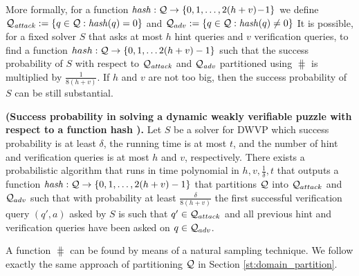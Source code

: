 More formally, for a function $\operatorname{\mathit{hash}}:\mathcal{Q} \rightarrow \{0,1,\dotsc, 2(h+v)\!-\!1 \}$
we define $\mathcal{Q}_{\mathit{attack}} := \{q \in \mathcal{Q} : \operatorname{\mathit{hash}}(q) = 0 \}$ and $\mathcal{Q}_{adv} := \{q \in \mathcal{Q}: \operatorname{\mathit{hash}}(q) \neq 0\}$
It is possible, for a fixed solver $S$ that asks at most $h$ hint queries and $v$ verification queries,
to find a function $hash: \mathcal{Q} \rightarrow \{0,1,\dotsc 2(h+v)-1\}$ such that the success probability of $S$ with respect to
$\mathcal{Q}_{\mathit{attack}}$ and $\mathcal{Q}_{\mathit{adv}}$ partitioned using $\hash$ is multiplied by $\frac{1}{8(h+v)}$.
If $h$ and $v$ are not too big, then the success probability of $S$ can be still substantial.
\begin{lemma}
\textbf{(Success probability in solving a dynamic weakly verifiable puzzle with respect to a function hash \cite{Dodis:2009:SAI:1530441.1530450}).}
  \label{lemma:hash_function_previous}
Let $S$ be a solver for DWVP which success probability is at least $\delta$, the running time is at most $t$,
and the number of hint and verification queries is at most $h$ and $v$, respectively.
There exists a probabilistic algorithm that runs in time polynomial in $h,v,\frac{1}{\delta},t$
that outputs a function $\operatorname{\mathit{hash}} : \mathcal{Q} \rightarrow \{0,1, \dotsc, 2(h+v)-1\}$
that partitions $\mathcal{Q}$ into $\mathcal{Q}_{attack}$ and $\mathcal{Q}_{adv}$ such that
with probability at least $\frac{\delta}{8(h+v)}$ the first successful verification query $(q',a)$ asked by $S$ is such that $q' \in \mathcal{Q}_{attack}$
and all previous hint and verification queries have been asked on $q \in \mathcal{Q}_{adv}$.
\end{lemma}
A function $\hash$ can be found by means of a natural sampling technique.
We follow exactly the same approach of partitioning $\mathcal{Q}$ in Section \ref{st:domain_partition}.

